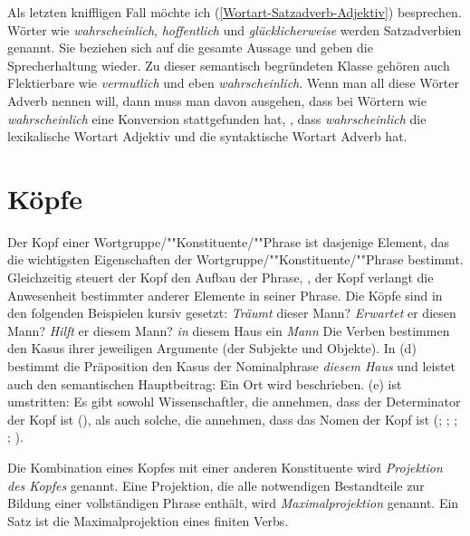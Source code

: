\documentclass[ number=45
			   ,series=eotms
			   ,printondemand
			  ]{langsci}
\newcommand{\page}{S.\,}
\let\citew=\citealp
\newcommand{\LATER}[1]{}
\begin{document}
\noindent
Als letzten kniffligen Fall möchte ich (\ref{Wortart-Satzadverb-Adjektiv}) besprechen. Wörter wie
\emph{wahrscheinlich}, \emph{hoffentlich} und \emph{glücklicherweise} werden Satzadverbien
genannt. Sie beziehen sich auf die gesamte Aussage und geben die Sprecherhaltung wieder. Zu dieser
semantisch begründeten Klasse gehören auch Flektierbare wie \emph{vermutlich} und eben
\emph{wahrscheinlich}. Wenn man all diese Wörter Adverb nennen will, dann muss man davon
ausgehen, dass bei Wörtern wie \emph{wahrscheinlich} eine Konversion stattgefunden hat, \dash, dass
\emph{wahrscheinlich} die lexikalische Wortart Adjektiv und die syntaktische Wortart Adverb hat.



\section{Köpfe}
\label{Abschnitt-Kopf}

%
Der Kopf einer Wortgruppe/""Konstituente/""Phrase ist dasjenige Element,
das die wichtigsten Eigenschaften der Wortgruppe/""Konstituente/""Phrase bestimmt.
Gleichzeitig steuert der Kopf den Aufbau der Phrase, \dash, der Kopf verlangt
die Anwesenheit bestimmter anderer Elemente in seiner Phrase. Die Köpfe sind
in den folgenden Beispielen kursiv gesetzt:
\eal
\ex \emph{Träumt} dieser Mann?
\ex \emph{Erwartet} er diesen Mann?
\ex \emph{Hilft} er diesem Mann?
\ex \emph{in} diesem Haus
\ex ein \emph{Mann}
\zl
Die Verben bestimmen den Kasus ihrer jeweiligen Argumente (der Subjekte und Objekte).
In (d) bestimmt die Präposition den Kasus der Nominalphrase \emph{diesem Haus} und
leistet auch den semantischen Hauptbeitrag: Ein Ort wird beschrieben. (e)
ist umstritten: Es gibt sowohl Wissenschaftler, die annehmen, dass der Determinator
der Kopf ist (\zb\LATER{\cite{Brame81a,Brame82a} \citealp[\page 90]{Hudson84a};
}\citealp{Hellan86a,Abney87a,Netter94,Netter98a}), als auch solche, die annehmen, dass das Nomen der
Kopf ist (\zb \citew{vanLangendonck94a}; \citealp[\page 49]{ps2}; \citealp{Demske2001a};
\citealp[Abschnitt~6.6.1]{MuellerLehrbuch1}; \citew{Hudson2004a}). 


Die Kombination eines Kopfes mit einer anderen Konstituente wird \emph{Projektion
des Kopfes} genannt. Eine Projektion, die alle notwendigen Bestandteile zur Bildung
einer vollständigen Phrase enthält, wird \emph{Maximalprojektion}
genannt. Ein Satz ist die Maximalprojektion eines finiten Verbs.
\end{document}

